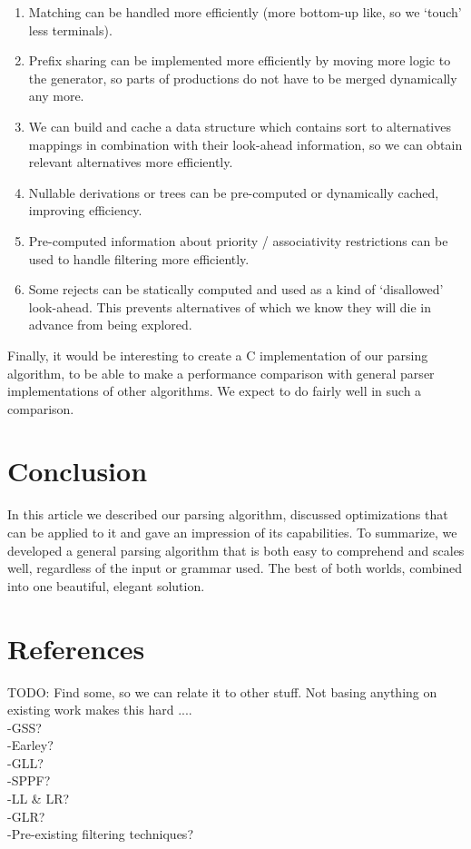 \documentclass[a4paper,10pt]{article}
\begin{document}
\begin{enumerate}
 \setlength{\itemsep}{0pt}
 \setlength{\parskip}{0pt}
 \setlength{\parsep}{0pt}
 
 \item Matching can be handled more efficiently (more bottom-up like, so we `touch' less terminals).
 \item Prefix sharing can be implemented more efficiently by moving more logic to the generator, so parts of productions do not have to be merged dynamically any more.
 \item We can build and cache a data structure which contains sort to alternatives mappings in combination with their look-ahead information, so we can obtain relevant alternatives more efficiently.
 \item Nullable derivations or trees can be pre-computed or dynamically cached, improving efficiency.
 \item Pre-computed information about priority / associativity restrictions can be used to handle filtering more efficiently.
 \item Some rejects can be statically computed and used as a kind of `disallowed' look-ahead. This prevents alternatives of which we know they will die in advance from being explored.
\end{enumerate}

Finally, it would be interesting to create a C implementation of our parsing algorithm, to be able to make a performance comparison with general parser implementations of other algorithms. We expect to do fairly well in such a comparison.

\section{Conclusion}

In this article we described our parsing algorithm, discussed optimizations that can be applied to it and gave an impression of its capabilities. To summarize, we developed a general parsing algorithm that is both easy to comprehend and scales well, regardless of the input or grammar used. The best of both worlds, combined into one beautiful, elegant solution.

\section{References}

TODO: Find some, so we can relate it to other stuff. Not basing anything on existing work makes this hard ....\\
-GSS?\\
-Earley?\\
-GLL?\\
-SPPF?\\
-LL \& LR?\\
-GLR?\\
-Pre-existing filtering techniques?
\end{document}
